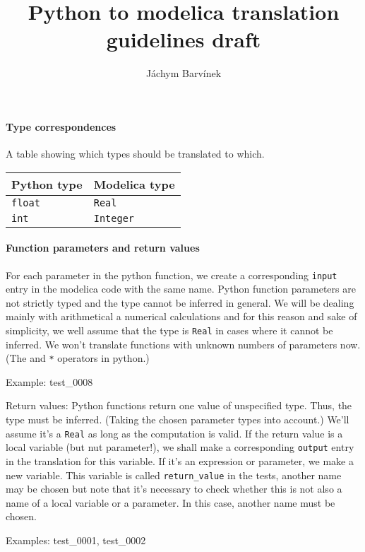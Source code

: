 \documentclass[a4paper,10pt]{article}
\title{Python to modelica translation guidelines draft}
\author{Jáchym Barvínek}
\date{}
\begin{document}
\maketitle

\paragraph{Type correspondences}
A table showing which types should be translated to which.
\begin{center}
\begin{tabular}{|l|l|}
\hline
Python type & Modelica type \\
\hline
\tt float & \tt Real \\
\tt int & \tt Integer \\
\hline
\end{tabular}
\end{center}


\paragraph{Function parameters and return values}
For each parameter in the python function, we create a corresponding {\tt input} entry in the modelica code with the same name.
Python function parameters are not strictly typed and the type cannot be inferred in general. 
We will be dealing mainly with arithmetical a numerical calculations and for this reason and sake of simplicity, we well assume
that the type is {\tt Real} in cases where it cannot be inferred.
We won't translate functions with unknown numbers of parameters now. (The {\tt *} and {\tt **} operators in python.)

Example: test\_0008

Return values: Python functions return one value of unspecified type. Thus, the type must be inferred.
(Taking the chosen parameter types into account.) We'll assume it's a {\tt Real} as long as the computation is valid.
If the return value is a local variable (but nut parameter!), we shall make a corresponding {\tt output}
entry in the translation for this variable. If it's an expression or parameter, we make a new variable.
This variable is called {\tt return\_value} in the tests, another name may be chosen but note that it's necessary to
check whether this is not also a name of a local variable or a parameter. In this case, another name must be chosen.

Examples: test\_0001, test\_0002
\end{document}
